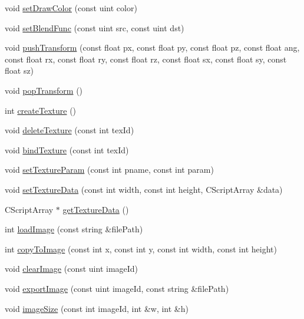 \begin{DoxyCompactItemize}
\item 
void \hyperlink{class_gfx_manager_a24e2d26c821c16e8775cb71c4145b1ae}{set\-Draw\-Color} (const uint color)
\item 
void \hyperlink{class_gfx_manager_a7879ec3e855fe3603b905445478d43d4}{set\-Blend\-Func} (const uint src, const uint dst)
\item 
void \hyperlink{class_gfx_manager_ae9fdd75f84990aca74c6929348b9f4a9}{push\-Transform} (const float px, const float py, const float pz, const float ang, const float rx, const float ry, const float rz, const float sx, const float sy, const float sz)
\item 
void \hyperlink{class_gfx_manager_ad98d73231d0697e16b23fd49cdf39ee0}{pop\-Transform} ()
\item 
int \hyperlink{class_gfx_manager_ae5c79fa50606b19b902f3428501a0f36}{create\-Texture} ()
\item 
void \hyperlink{class_gfx_manager_a1c1d9f04366caaedd6ff388af3c5e193}{delete\-Texture} (const int tex\-Id)
\item 
void \hyperlink{class_gfx_manager_afcac8f5c6ba4901f5af128587c9bcdb1}{bind\-Texture} (const int tex\-Id)
\item 
void \hyperlink{class_gfx_manager_ad9159ed6c440e855cc635ba1f2693ccc}{set\-Texture\-Param} (const int pname, const int param)
\item 
void \hyperlink{class_gfx_manager_a24d63ef387d78ad074c30ee538fba99b}{set\-Texture\-Data} (const int width, const int height, C\-Script\-Array \&data)
\item 
C\-Script\-Array $\ast$ \hyperlink{class_gfx_manager_ab3a746841270d93f9da789cadd08fad0}{get\-Texture\-Data} ()
\item 
int \hyperlink{class_gfx_manager_afeb76daebb619fc523831594d898bdd0}{load\-Image} (const string \&file\-Path)
\item 
int \hyperlink{class_gfx_manager_ae60b0f7005ce91c3122f845f1542e3ca}{copy\-To\-Image} (const int x, const int y, const int width, const int height)
\item 
void \hyperlink{class_gfx_manager_a8783e515d8d4c7c5b0b1d8060033c777}{clear\-Image} (const uint image\-Id)
\item 
void \hyperlink{class_gfx_manager_a6ec82f52cc2217e0cec1f0ab29adf624}{export\-Image} (const uint image\-Id, const string \&file\-Path)
\item 
void \hyperlink{class_gfx_manager_a181f8f2c4a3be78ef8b00c03c964ed12}{image\-Size} (const int image\-Id, int \&w, int \&h)
\item 

\end{DoxyCompactItemize}
